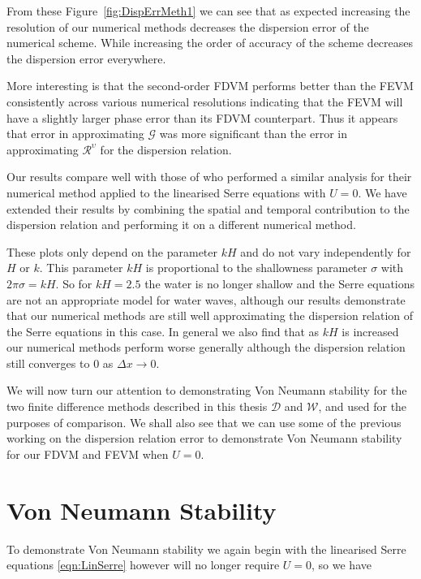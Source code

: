 From these Figure~\ref{fig:DispErrMeth1} we can see that as expected increasing the resolution of our numerical methods decreases the dispersion error of the numerical scheme. While increasing the order of accuracy of the scheme decreases the dispersion error everywhere. 

More interesting is that the second-order FDVM performs better than the FEVM consistently across various numerical resolutions indicating that the FEVM will have a slightly larger phase error than its FDVM counterpart. Thus it appears that error in approximating $\mathcal{G}$ was more significant than the error in approximating $\mathcal{R}^{\upsilon}$ for the dispersion relation.

Our results compare well with those of \cite{Filippini-etal-2016-381} who performed a similar analysis for their numerical method applied to the linearised Serre equations with $U=0$. We have extended their results by combining the spatial and temporal contribution to the dispersion relation and performing it on a different numerical method. 

These plots only depend on the parameter $kH$ and do not vary independently for $H$ or $k$. This parameter $kH$ is proportional to the shallowness parameter $\sigma$ with $2 \pi \sigma = kH $. So for $kH=2.5$ the water is no longer shallow and the Serre equations are not an appropriate model for water waves, although our results demonstrate that our numerical methods are still well approximating the dispersion relation of the Serre equations in this case. In general we also find that as $kH$ is increased our numerical methods perform worse generally although the dispersion relation still converges to $0$ as $\Delta x \rightarrow 0$. 

We will now turn our attention to demonstrating Von Neumann stability for the two finite difference methods described in this thesis $\mathcal{D}$ and $\mathcal{W}$, and used for the purposes of comparison. We shall also see that we can use some of the previous working on the dispersion relation error to demonstrate Von Neumann stability for our FDVM and FEVM when $U=0$. 



\section{Von Neumann Stability}
To demonstrate Von Neumann stability we again begin with the linearised Serre equations \eqref{eqn:LinSerre} however will no longer require $U=0$, so we have

